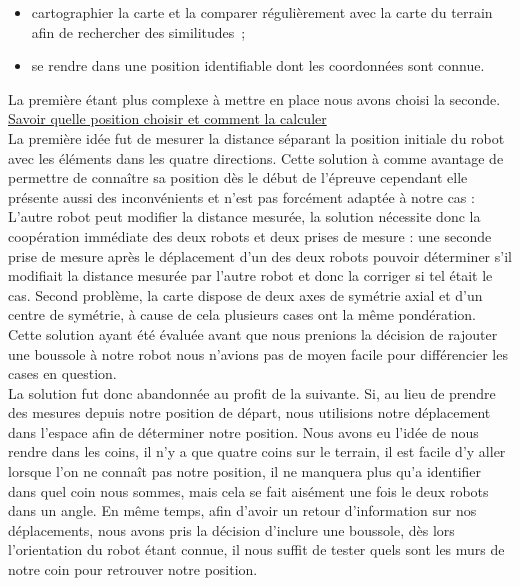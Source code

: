 \documentclass{article}
\begin{document}
\begin{itemize}
  \item cartographier la carte et la comparer régulièrement avec la carte du terrain afin de rechercher des similitudes~;
  \item se rendre dans une position identifiable dont les coordonnées sont connue. \\
\end{itemize}

La première étant plus complexe à mettre en place nous avons choisi la seconde. \\

\underline{Savoir quelle position choisir et comment la calculer} \\

La première idée fut de mesurer la distance séparant la position initiale du robot avec les éléments dans les quatre directions. Cette solution à comme avantage de permettre de connaître sa position dès le début de l'épreuve cependant elle présente aussi des inconvénients et n'est pas forcément adaptée à notre cas : L'autre robot peut modifier la distance mesurée, la solution nécessite donc la coopération immédiate des deux robots et deux prises de mesure : une seconde prise de mesure après le déplacement d'un des deux robots pouvoir déterminer s'il modifiait la distance mesurée par l'autre robot et donc la corriger si tel était le cas. Second problème, la carte dispose de deux axes de symétrie axial et d'un centre de symétrie, à cause de cela plusieurs cases ont la même pondération. Cette solution ayant été évaluée avant que nous prenions la décision de rajouter une boussole à notre robot nous n'avions pas de moyen facile pour différencier les cases en question. \\

La solution fut donc abandonnée au profit de la suivante. Si, au lieu de prendre des mesures depuis notre position de départ, nous utilisions notre déplacement dans l'espace afin de déterminer notre position. Nous avons eu l'idée de nous rendre dans les coins, il n'y a que quatre coins sur le terrain, il est facile d'y aller lorsque l'on ne connaît pas notre position, il ne manquera plus qu'a identifier dans quel coin nous sommes, mais cela se fait aisément une fois le deux robots dans un angle. En même temps, afin d'avoir un retour d'information sur nos déplacements, nous avons pris la décision d'inclure une boussole, dès lors l'orientation du robot étant connue, il nous suffit de tester quels sont les murs de notre coin pour retrouver notre position. \\
\end{document}
